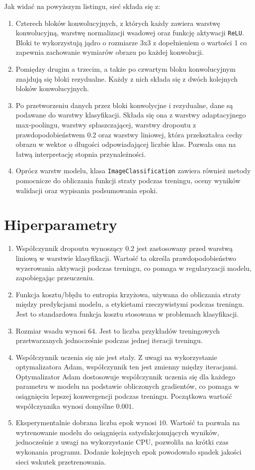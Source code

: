 \documentclass[11pt]{article}
\begin{document}
	Jak widać na powyższym listingu, sieć składa się z:
	\begin{enumerate}
		\item Czterech bloków konwolucyjnych, z których każdy zawiera warstwę konwolucyjną, warstwę normalizacji
			wsadowej oraz funkcję aktywacji \texttt{ReLU}. Bloki te wykorzystują jądro o rozmiarze 3x3 z dopełnieniem o wartości 1
			co zapewnia zachowanie wymiarów obrazu po każdej konwolucji.
		\item Pomiędzy drugim a trzecim, a także po czwartym bloku konwolucyjnym znajdują się bloki rezydualne. Każdy
			z nich składa się z dwóch kolejnych bloków konwolucyjnych.
		\item Po przetworzeniu danych przez bloki konwolycjne i rezydualne, dane są podawane do warstwy klasyfikacji.
			Składa się ona z warstwy adaptacyjnego max-poolingu, warstwy spłaszczającej, warstwy dropoutu z prawdopodobieństwem 0.2
			oraz warstwy liniowej, która przekształca cechy obrazu w wektor o długości odpowiadającej liczbie klas. Pozwala ona na łatwą interpretację stopnia przynależności.
		\item Oprócz warstw modelu, klasa \texttt{ImageClassification} zawiera również metody pomocnicze do obliczania funkcji straty podczas treningu,
			oceny wyników walidacji oraz wypisania podsumowania epoki.
	\end{enumerate}

	\section{Hiperparametry}
	\begin{enumerate}
		\item Współczynnik dropoutu wynoszący $0.2$ jest zastosowany przed warstwą liniową w warstwie klasyfikacji.
			Wartość ta określa prawdopodobieństwo wyzerowania aktywacji podczas treningu, co pomaga w regularyzacji modelu, zapobiegając przeuczeniu.
		\item Funkcja kosztu/błędu to entropia krzyżowa, używana do obliczania straty między predykcjami modelu, a etykietami
			rzeczywistymi podczas treningu. Jest to standardowa funkcja kosztu stosowana w problemach klasyfikacji.
		\item Rozmiar wsadu wynosi $64$. Jest to liczba przykładów treningowych przetwarzanych jednocześnie podczas jednej iteracji treningu.
		\item Współczynnik uczenia się nie jest stały. Z uwagi na wykorzystanie optymalizatora Adam, współczynnik ten jest zmienny między iteracjami. 
			Optymalizator Adam dostosowuje współczynnik uczenia się dla każdego parametru w modelu na podstawie obliczonych gradientów, co pomaga w osiągnięciu lepszej konwergencji podczas treningu.
			Początkowa wartość współczynnika wynosi domyślne $0.001$.
		\item Eksperymentalnie dobrana liczba epok wynosi $10$. Wartość ta pozwala na wytrenowanie modelu do osiągnięcia satysfakcjonujących wyników, jednocześnie z uwagi na wykorzystanie CPU, pozwoliła na 
			krótki czas wykonania programu. Dodanie kolejnych epok powodowało spadek jakości sieci wskutek przetrenowania.
	\end{enumerate}
\end{document}
